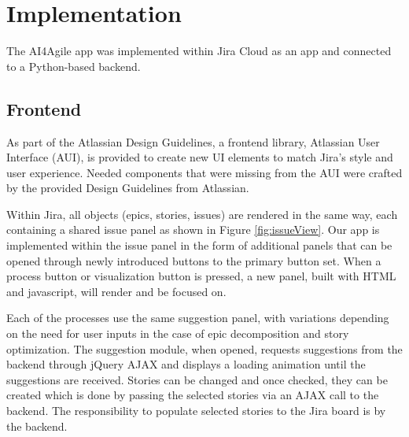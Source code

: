 \section{Implementation}
\label{implementation}

The AI4Agile app was implemented within Jira Cloud as an app and connected to a Python-based backend.

\subsection{Frontend}

As part of the Atlassian Design Guidelines, a frontend library, Atlassian User Interface (AUI), is provided to create new UI elements to match Jira’s style and user experience. Needed components that were missing from the AUI were crafted by the provided Design Guidelines from Atlassian.

Within Jira, all objects (epics, stories, issues) are rendered in the same way, each containing a shared issue panel as shown in Figure \ref{fig:issueView}. Our app is implemented within the issue panel in the form of additional panels that can be opened through newly introduced buttons to the primary button set. When a process button or visualization button is pressed, a new panel, built with HTML and javascript, will render and be focused on.

Each of the processes use the same suggestion panel, with variations depending on the need for user inputs in the case of epic decomposition and story optimization. The suggestion module, when opened, requests suggestions from the backend through jQuery AJAX and displays a loading animation until the suggestions are received. Stories can be changed and once checked, they can be created which is done by passing the selected stories via an AJAX call to the backend. The responsibility to populate selected stories to the Jira board is by the backend.

